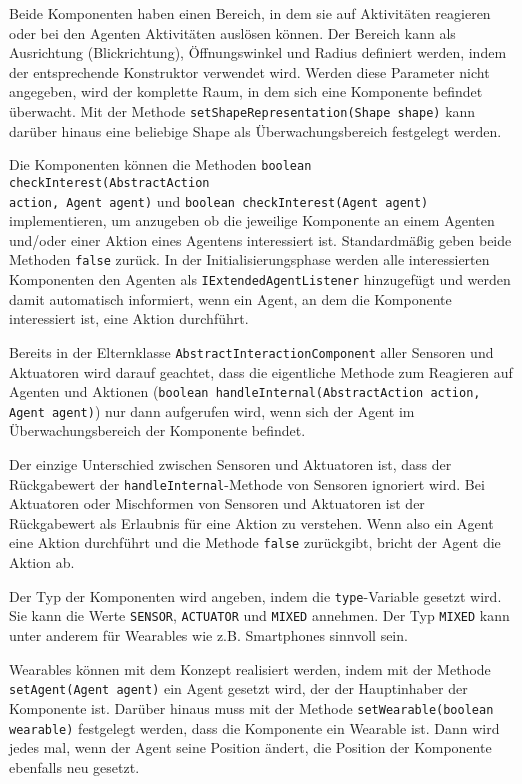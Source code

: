 Beide Komponenten haben einen Bereich, in dem sie auf Aktivitäten reagieren oder bei den Agenten Aktivitäten auslösen können. Der Bereich kann als Ausrichtung (Blickrichtung), Öffnungswinkel und Radius definiert werden, indem der entsprechende Konstruktor verwendet wird. Werden diese Parameter nicht angegeben, wird der komplette Raum, in dem sich eine Komponente befindet überwacht. Mit der Methode \texttt{setShapeRepresentation(Shape shape)} kann darüber hinaus eine beliebige Shape als Überwachungsbereich festgelegt werden.

Die Komponenten können die Methoden \texttt{boolean checkInterest\-(AbstractAction\\
action, Agent agent)} und \texttt{boolean checkInterest(Agent agent)} implementieren, um anzugeben ob die jeweilige Komponente an einem Agenten und/oder einer Aktion eines Agentens interessiert ist. Standardmäßig geben beide Methoden \texttt{false} zurück. In der Initialisierungsphase werden alle interessierten Komponenten den Agenten als \texttt{IExtendedAgentListener} hinzugefügt und werden damit automatisch informiert, wenn ein Agent, an dem die Komponente interessiert ist, eine Aktion durchführt.

 Bereits in der Elternklasse \texttt{AbstractInteractionComponent} aller Sensoren und Aktuatoren wird darauf geachtet, dass die eigentliche Methode zum Reagieren auf Agenten und Aktionen (\texttt{boolean handleInternal(AbstractAction action, Agent agent)}) nur dann aufgerufen wird, wenn sich der Agent im Überwachungsbereich der Komponente befindet.

Der einzige Unterschied zwischen Sensoren und Aktuatoren ist, dass der Rückgabewert der \texttt{handle\-Internal}-Methode von Sensoren ignoriert wird. Bei Aktuatoren oder Mischformen von Sensoren und Aktuatoren ist der Rückgabewert als Erlaubnis für eine Aktion zu verstehen. Wenn also ein Agent eine Aktion durchführt und die Methode \texttt{false} zurückgibt, bricht der Agent die Aktion ab.

Der Typ der Komponenten wird angeben, indem die \texttt{type}-Variable gesetzt wird. Sie kann die Werte \texttt{SENSOR}, \texttt{ACTUATOR} und \texttt{MIXED} annehmen. Der Typ \texttt{MIXED} kann unter anderem für Wearables wie z.B. Smartphones sinnvoll sein.

Wearables können mit dem Konzept realisiert werden, indem mit der Methode \texttt{setAgent(Agent agent)} ein Agent gesetzt wird, der der Hauptinhaber der Komponente ist. Darüber hinaus muss mit der Methode \texttt{setWearable(boolean wearable)} festgelegt werden, dass die Komponente ein Wearable ist. Dann wird jedes mal, wenn der Agent seine Position ändert, die Position der Komponente ebenfalls neu gesetzt.
